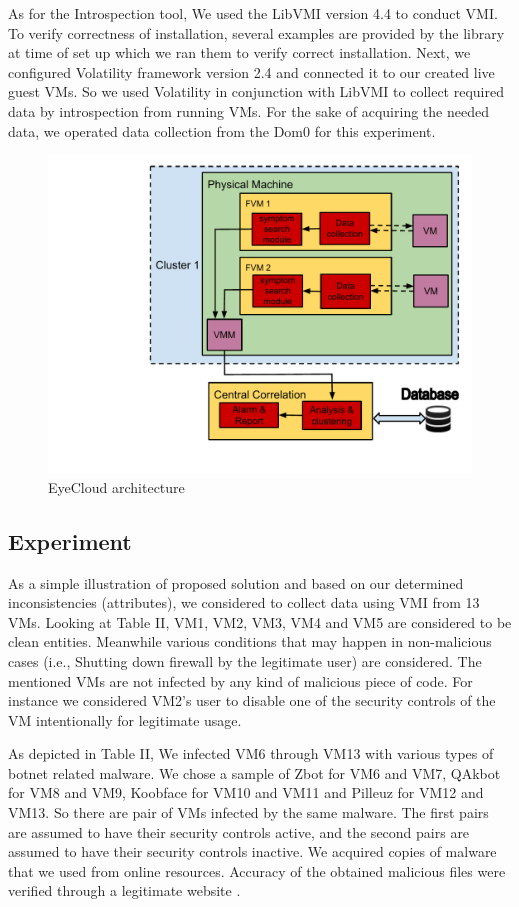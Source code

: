 \documentclass[conference]{IEEEtran}
\begin{document}
As for the Introspection tool, We used the LibVMI version 4.4 to conduct VMI. To verify correctness of installation, several examples are provided by the library at time of set up which we ran them to verify correct installation. Next, we configured Volatility framework version 2.4 and connected it to our created live guest VMs. So we used Volatility in conjunction with LibVMI to collect required data by introspection from running VMs. For the sake of acquiring the needed data, we operated data collection from the Dom0 for this experiment.    
\begin{figure}
\hspace{-1.5cm}
\includegraphics[scale=0.5]{pic114.pdf}
\caption{EyeCloud architecture}
\label{Fig:114}
\end{figure}
\subsection{Experiment}
As a simple illustration of proposed solution and based on our determined inconsistencies (attributes), we considered to collect data using VMI from 13 VMs. Looking at Table II, VM1, VM2, VM3, VM4 and VM5 are considered to be clean entities. Meanwhile various conditions that may happen in non-malicious cases (i.e., Shutting down firewall by the legitimate user) are considered. The mentioned VMs are not infected by any kind of malicious piece of code. For instance we considered VM2's user to disable one of the security controls of the VM intentionally for legitimate usage.   

As depicted in Table II, We infected VM6 through VM13 with various types of botnet related malware. We chose a sample of Zbot for VM6 and VM7, QAkbot for VM8 and VM9, Koobface for VM10 and VM11 and Pilleuz for VM12 and VM13. So there are pair of VMs infected by the same malware. The first pairs are assumed to have their security controls active, and the second pairs are assumed to have their security controls inactive. We acquired copies of malware that we used from online resources. Accuracy of the obtained malicious files were verified through a legitimate website \cite{ref45}.
\end{document}
